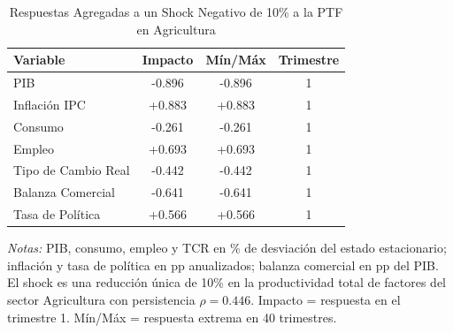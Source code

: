 \begin{table}[htbp]
\centering
\caption{Respuestas Agregadas a un Shock Negativo de 10\% a la PTF en Agricultura}
\label{tab:agr_agg}
\begin{threeparttable}
\begin{tabular}{@{}l c c c@{}}
\toprule
Variable & Impacto & Mín/Máx & Trimestre \\
\midrule
PIB & -0.896 & -0.896 & 1 \\
Inflación IPC & +0.883 & +0.883 & 1 \\
Consumo & -0.261 & -0.261 & 1 \\
Empleo & +0.693 & +0.693 & 1 \\
Tipo de Cambio Real & -0.442 & -0.442 & 1 \\
Balanza Comercial & -0.641 & -0.641 & 1 \\
Tasa de Política & +0.566 & +0.566 & 1 \\
\bottomrule
\end{tabular}
\begin{tablenotes}[flushleft]
\footnotesize
\item \textit{Notas:} PIB, consumo, empleo y TCR en \% de desviación del estado estacionario; inflación y tasa de política en pp anualizados; balanza comercial en pp del PIB. El shock es una reducción única de 10\% en la productividad total de factores del sector Agricultura con persistencia $\rho = 0.446$. Impacto = respuesta en el trimestre 1. Mín/Máx = respuesta extrema en 40 trimestres.
\end{tablenotes}
\end{threeparttable}
\end{table}
